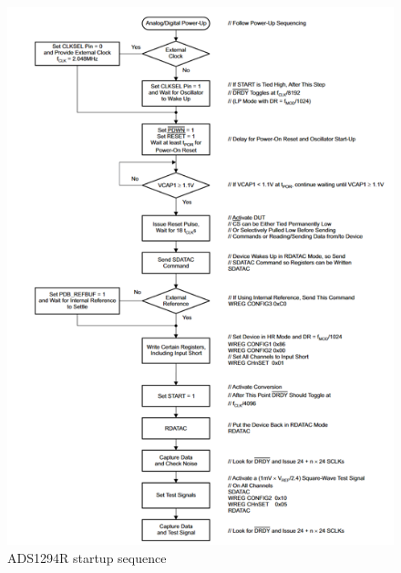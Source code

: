 \begin{figure}[!ht]
  \caption{ADS1294R startup sequence}\label{fig:ads_startup}
  \centering
  \includegraphics[width=1\columnwidth/2]{chapters/development/results/ADS_Startup_Sequence}
\end{figure}

